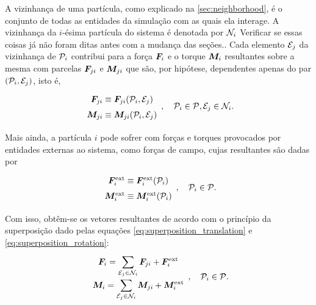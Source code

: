 A vizinhança de uma partícula, como explicado na \autoref{sec:neighborhood}, é o conjunto de todas as entidades da simulação com as quais ela interage. A vizinhança da \(i\)-ésima partícula do sistema é denotada por \({\mathcal{N}}_{i}\) \alert{Verificar se essas coisas já não foram ditas antes com a mudança das seções.}. Cada elemento \({\mathcal{E}}_{j}\) da vizinhança de \(\particlei\) contribui para a força \({\bm{F}}_{i}\) e o torque \({\bm{M}}_{i}\) resultantes sobre a mesma com parcelas \({\bm{F}}_{j i}\) e \({\bm{M}}_{j i}\) que são, por hipótese, dependentes apenas do par \(\orderedPair{\particlei}{\elementj}\), isto é,
\begin{equation*}
	\def\arraystretch{1.5}
	\begin{array}{c}
		\displaystyle \forceji \equiv \forceji\pqty{\particlei, \elementj} \\
		\displaystyle \torqueji \equiv \torqueji\pqty{\particlei, \elementj} \\
	\end{array}, \quad \particlei \in \particleSet, \elementj \in \neighborhoodi.
\end{equation*}

Mais ainda, a partícula \(i\) pode sofrer com forças e torques provocados por entidades externas ao sistema, como forças de campo, cujas resultantes são dadas por
\begin{equation*}
	\def\arraystretch{1.5}
	\begin{array}{c}
		\external\forcei \equiv \external\forcei\pqty{\particlei} \\
		\external\torquei \equiv \external\torquei\pqty{\particlei} \\
	\end{array}, \quad \particlei \in \particleSet.
\end{equation*}
 
Com isso, obtêm-se os vetores resultantes de acordo com o princípio da superposição dado pelas equações \eqref{eq:superposition_translation} e \eqref{eq:superposition_rotation}:
\begin{equation*}
	\def\arraystretch{1.5}
	\begin{array}{c}
		\resultingForcei = \dsum_{\elementj\in\neighborhoodi}\forceji + \external\forcei\\
		\resultingTorquei = \dsum_{\elementj\in\neighborhoodi}\torqueji + \external\torquei
	\end{array}, \quad \particlei\in\particleSet.
\end{equation*}

